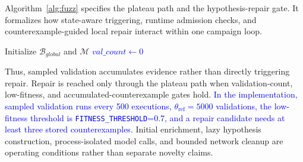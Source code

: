 \documentclass[final,5p,times,number]{elsarticle}
\begin{document}
Algorithm~\ref{alg:fuzz} specifies the plateau path and the hypothesis-repair gate. It formalizes how state-aware triggering, runtime admission checks, and counterexample-guided local repair interact within one campaign loop.

\begin{algorithm}[!htbp]
\caption{Runtime-Validated Plateau\\Recovery}
\label{alg:fuzz}
\SetAlgoLined
{}
\footnotesize
\DontPrintSemicolon
{}
Initialize $\mathcal{B}_{global}$ and $\mathcal{M}$\;
\textcolor{blue}{$val\_count \leftarrow 0$}\;
\end{algorithm}

Thus, sampled validation accumulates evidence rather than directly triggering repair. Repair is reached only through the plateau path when validation-count, low-fitness, and accumulated-counterexample gates hold. \textcolor{blue}{In the implementation, sampled validation runs every 500 executions, $\theta_{\mathrm{ref}}=5000$ validations, the low-fitness threshold is \texttt{FITNESS\_THRESHOLD}=0.7, and a repair candidate needs at least three stored counterexamples.} Initial enrichment, lazy hypothesis construction, process-isolated model calls, and bounded network cleanup are operating conditions rather than separate novelty claims.
\end{document}
